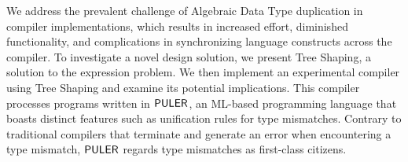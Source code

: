 We address the prevalent challenge of Algebraic Data Type duplication in compiler implementations, which results in increased effort, diminished functionality, and complications in synchronizing language constructs across the compiler. To investigate a novel design solution, we present Tree Shaping, a solution to the expression problem. We then implement an experimental compiler using Tree Shaping and examine its potential implications. This compiler processes programs written in $\mathsf{PULER}$, an ML-based programming language that boasts distinct features such as unification rules for type mismatches. Contrary to traditional compilers that terminate and generate an error when encountering a type mismatch, $\mathsf{PULER}$ regards type mismatches as first-class citizens.